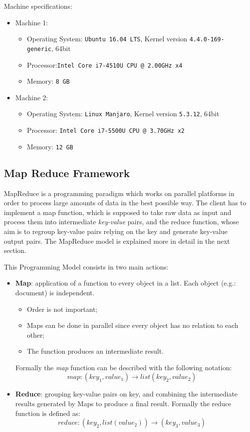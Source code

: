 \documentclass[a4paper,11pt, twoside]{article}
\begin{document}
		\noindent
		Machine specifications:
		\begin{itemize}
			\item Machine 1:\begin{itemize}
			\item Operating System: \texttt{Ubuntu 16.04 LTS}, Kernel version \texttt{4.4.0-169-generic}, 64bit
			\item Processor:\texttt{Intel Core\texttrademark\ i7-4510U CPU @ 2.00GHz x4}
			\item Memory: \texttt{8 GB}
		\end{itemize} 
			\item Machine 2: \begin{itemize}
				\item Operating System: \texttt{Linux Manjaro}, Kernel version \texttt{5.3.12}, 64bit
				\item Processor:  \texttt{Intel Core\texttrademark\ i7-5500U CPU @ 3.70GHz x2}
				\item Memory: \texttt{12 GB}
			\end{itemize}
		\end{itemize}
		

		

	\subsection{Map Reduce Framework}
		MapReduce is a programming paradigm which works on parallel platforms in order to process large amounts of data in the best possible way. The client has to implement a map function, which is supposed to take raw data as input and process them into intermediate \textit{key-value} pairs, and the reduce function, whose aim is to regroup key-value pairs relying on the key and generate key-value output pairs. The MapReduce model is explained more in detail in the next section.
		
		\bigskip

		\noindent
		This Programming Model consists in two main actions:
		\begin{itemize}
			\item \textbf{Map}: application of a function to every object in a list. Each object (e.g.: document) is independent.
			\begin{itemize}
				\item Order is not important;
				\item Maps can be done in parallel since every object has no relation to each other;
				\item The function produces an intermediate result.
			\end{itemize}
			Formally the \textit{map} function can be described with the following notation: \[ map:(key_1, value_1) \to list(key_2, value_2) \]
			\item \textbf{Reduce}: grouping key-value pairs on key, and combining the intermediate results generated by Maps to produce a final result. Formally the reduce function is defined as: 
			\[
				reduce:(key_2, list(value_2)) \to (key_3, value_3)  
			\]
		\end{itemize}
\end{document}
